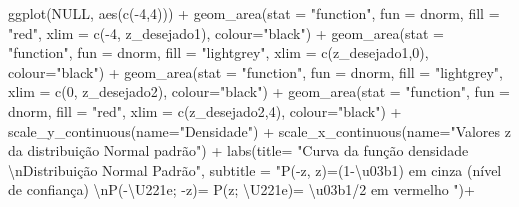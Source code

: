 \documentclass[
]{book}
\newenvironment{Shaded}{\begin{snugshade}}{\end{snugshade}}
\newcommand{\AttributeTok}[1]{\textcolor[rgb]{0.77,0.63,0.00}{#1}}
\newcommand{\ConstantTok}[1]{\textcolor[rgb]{0.00,0.00,0.00}{#1}}
\newcommand{\DecValTok}[1]{\textcolor[rgb]{0.00,0.00,0.81}{#1}}
\newcommand{\FunctionTok}[1]{\textcolor[rgb]{0.00,0.00,0.00}{#1}}
\newcommand{\NormalTok}[1]{#1}
\newcommand{\SpecialCharTok}[1]{\textcolor[rgb]{0.00,0.00,0.00}{#1}}
\newcommand{\StringTok}[1]{\textcolor[rgb]{0.31,0.60,0.02}{#1}}
\begin{document}
\begin{Shaded}
\begin{Highlighting}[]
\FunctionTok{ggplot}\NormalTok{(}\ConstantTok{NULL}\NormalTok{, }\FunctionTok{aes}\NormalTok{(}\FunctionTok{c}\NormalTok{(}\SpecialCharTok{{-}}\DecValTok{4}\NormalTok{,}\DecValTok{4}\NormalTok{))) }\SpecialCharTok{+}
  \FunctionTok{geom\_area}\NormalTok{(}\AttributeTok{stat =} \StringTok{"function"}\NormalTok{, }
            \AttributeTok{fun =}\NormalTok{ dnorm, }
            \AttributeTok{fill =} \StringTok{"red"}\NormalTok{, }
            \AttributeTok{xlim =} \FunctionTok{c}\NormalTok{(}\SpecialCharTok{{-}}\DecValTok{4}\NormalTok{, z\_desejado1),}
            \AttributeTok{colour=}\StringTok{"black"}\NormalTok{) }\SpecialCharTok{+}
  \FunctionTok{geom\_area}\NormalTok{(}\AttributeTok{stat =} \StringTok{"function"}\NormalTok{, }
            \AttributeTok{fun =}\NormalTok{ dnorm, }
            \AttributeTok{fill =} \StringTok{"lightgrey"}\NormalTok{, }
            \AttributeTok{xlim =} \FunctionTok{c}\NormalTok{(z\_desejado1,}\DecValTok{0}\NormalTok{),}
            \AttributeTok{colour=}\StringTok{"black"}\NormalTok{) }\SpecialCharTok{+}
  \FunctionTok{geom\_area}\NormalTok{(}\AttributeTok{stat =} \StringTok{"function"}\NormalTok{, }
            \AttributeTok{fun =}\NormalTok{ dnorm, }
            \AttributeTok{fill =} \StringTok{"lightgrey"}\NormalTok{, }
            \AttributeTok{xlim =} \FunctionTok{c}\NormalTok{(}\DecValTok{0}\NormalTok{, z\_desejado2),}
            \AttributeTok{colour=}\StringTok{"black"}\NormalTok{) }\SpecialCharTok{+}
  \FunctionTok{geom\_area}\NormalTok{(}\AttributeTok{stat =} \StringTok{"function"}\NormalTok{, }
            \AttributeTok{fun =}\NormalTok{ dnorm, }
            \AttributeTok{fill =} \StringTok{"red"}\NormalTok{, }
            \AttributeTok{xlim =} \FunctionTok{c}\NormalTok{(z\_desejado2,}\DecValTok{4}\NormalTok{),}
            \AttributeTok{colour=}\StringTok{"black"}\NormalTok{) }\SpecialCharTok{+}
  \FunctionTok{scale\_y\_continuous}\NormalTok{(}\AttributeTok{name=}\StringTok{"Densidade"}\NormalTok{) }\SpecialCharTok{+}
  \FunctionTok{scale\_x\_continuous}\NormalTok{(}\AttributeTok{name=}\StringTok{"Valores \textasciigrave{}\textasciigrave{}z\textquotesingle{}\textquotesingle{} da distribuição Normal padrão"}\NormalTok{)  }\SpecialCharTok{+}
  \FunctionTok{labs}\NormalTok{(}\AttributeTok{title=} 
         \StringTok{"Curva da função densidade }\SpecialCharTok{\textbackslash{}n}\StringTok{Distribuição Normal Padrão"}\NormalTok{, }
       \AttributeTok{subtitle =} \StringTok{"P({-}z, z)=(1{-}\textbackslash{}u03b1) em cinza (nível de confiança) }\SpecialCharTok{\textbackslash{}n}\StringTok{P({-}\textbackslash{}U221e; {-}z)= P(z; \textbackslash{}U221e)= \textbackslash{}u03b1/2 em vermelho "}\NormalTok{)}\SpecialCharTok{+}

\end{Highlighting}
\end{Shaded}
\end{document}

